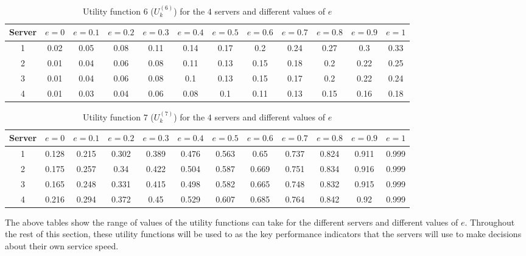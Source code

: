 \begin{table}[H]
    \caption{Utility function \(6\) (\(U_k^{(6)}\)) for the \(4\) servers and
    different values of \(e\)}
    \label{tab:case_study_utility_6_all_servers}
    \begin{adjustbox}{width=\columnwidth,center}
        \begin{tabular}{|c|c|c|c|c|c|c|c|c|c|c|c|}
            \hline
            Server & \(e = 0\) & \(e = 0.1\) & \(e = 0.2\) & \(e = 0.3\)
                   & \(e = 0.4\) & \(e = 0.5\) & \(e = 0.6\) & \(e = 0.7\)
                   & \(e = 0.8\) & \(e = 0.9\) & \(e = 1\) \\
            \hline
            1 & 0.02 & 0.05 & 0.08 & 0.11 & 0.14 & 0.17 & 0.2 & 0.24
            & 0.27 & 0.3 & 0.33 \\ 
            2 & 0.01 & 0.04 & 0.06 & 0.08 & 0.11 & 0.13 & 0.15 & 0.18
            & 0.2 & 0.22 & 0.25 \\ 
            3 & 0.01 & 0.04 & 0.06 & 0.08 & 0.1 & 0.13 & 0.15 & 0.17
            & 0.2 & 0.22 & 0.24 \\ 
            4 & 0.01 & 0.03 & 0.04 & 0.06 & 0.08 & 0.1 & 0.11 & 0.13
            & 0.15 & 0.16 & 0.18 \\ 
            \hline
        \end{tabular}
    \end{adjustbox}
\end{table}

\begin{table}[H]
    \caption{Utility function \(7\) (\(U_k^{(7)}\)) for the \(4\) servers and
    different values of \(e\)}
    \label{tab:case_study_utility_7_all_servers}
    \begin{adjustbox}{width=\columnwidth,center}
        \begin{tabular}{|c|c|c|c|c|c|c|c|c|c|c|c|}
            \hline
            Server & \(e = 0\) & \(e = 0.1\) & \(e = 0.2\) & \(e = 0.3\)
                   & \(e = 0.4\) & \(e = 0.5\) & \(e = 0.6\) & \(e = 0.7\)
                   & \(e = 0.8\) & \(e = 0.9\) & \(e = 1\) \\
            \hline
            1 & 0.128 & 0.215 & 0.302 & 0.389 & 0.476 & 0.563 & 0.65 & 0.737
            & 0.824 & 0.911 & 0.999 \\ 
            2 & 0.175 & 0.257 & 0.34 & 0.422 & 0.504 & 0.587 & 0.669 & 0.751
            & 0.834 & 0.916 & 0.999 \\ 
            3 & 0.165 & 0.248 & 0.331 & 0.415 & 0.498 & 0.582 & 0.665 & 0.748
            & 0.832 & 0.915 & 0.999 \\ 
            4 & 0.216 & 0.294 & 0.372 & 0.45 & 0.529 & 0.607 & 0.685 & 0.764
            & 0.842 & 0.92 & 0.999 \\ 
            \hline
        \end{tabular}
    \end{adjustbox}
\end{table}

The above tables show the range of values of the utility functions can take
for the different servers and different values of \(e\).
Throughout the rest of this section, these utility functions will be used to
as the key performance indicators that the servers will use to make decisions
about their own service speed.
